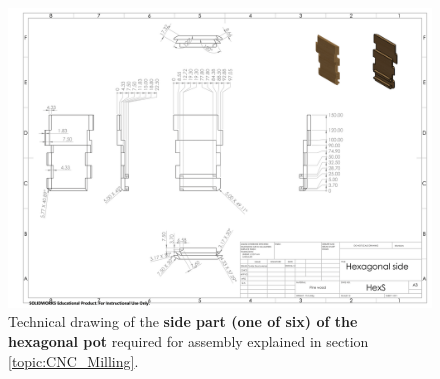 \documentclass[12pt]{extarticle} %
\begin{document}
\begin{figure}
    \centering
    \includegraphics[width=1\textwidth ]{images/technical_drawings/Hexagonal side-1.png}
    \caption{Technical drawing of the \textbf{side part (one of six) of the hexagonal pot} required for assembly explained in section \ref{topic:CNC_Milling}.}
    \label{technical_drawing:hex_pot_side_part}
\end{figure}
\end{document}
